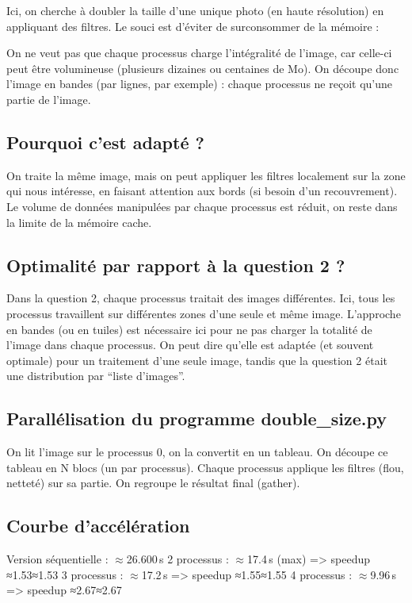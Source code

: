 \documentclass[a4paper,13pt]{book}
\begin{document}
Ici, on cherche à doubler la taille d’une unique photo (en haute résolution) en appliquant des filtres. Le souci est d’éviter de surconsommer de la mémoire :

    On ne veut pas que chaque processus charge l’intégralité de l’image, car celle-ci peut être volumineuse (plusieurs dizaines ou centaines de Mo).
    On découpe donc l’image en bandes (par lignes, par exemple) : chaque processus ne reçoit qu’une partie de l’image.

\subsection{Pourquoi c’est adapté ?}

    On traite la même image, mais on peut appliquer les filtres localement sur la zone qui nous intéresse, en faisant attention aux bords (si besoin d’un recouvrement).
    Le volume de données manipulées par chaque processus est réduit, on reste dans la limite de la mémoire cache.

\subsection{Optimalité par rapport à la question 2 ?}

    Dans la question 2, chaque processus traitait des images différentes. Ici, tous les processus travaillent sur différentes zones d’une seule et même image.
    L’approche en bandes (ou en tuiles) est nécessaire ici pour ne pas charger la totalité de l’image dans chaque processus.
    On peut dire qu’elle est adaptée (et souvent optimale) pour un traitement d’une seule image, tandis que la question 2 était une distribution par “liste d’images”.

\subsection{ Parallélisation du programme double_size.py}

    On lit l’image sur le processus 0, on la convertit en un tableau.
    On découpe ce tableau en N blocs (un par processus).
    Chaque processus applique les filtres (flou, netteté) sur sa partie.
    On regroupe le résultat final (gather).

\subsection{Courbe d’accélération}


    Version séquentielle : $\approx$26.600 s
    2 processus : $\approx$17.4 s (max) => speedup ≈1.53≈1.53
    3 processus : $\approx$17.2 s => speedup ≈1.55≈1.55
    4 processus : $\approx$9.96 s => speedup ≈2.67≈2.67
\end{document}
